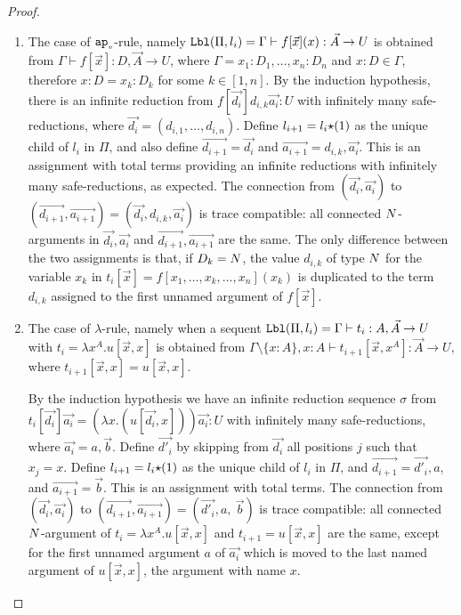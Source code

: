 \begin{proof}
\begin{enumerate}
\item
  The case of ${{\tt ap}_{\mbox{\tiny $v$}}}$-rule, namely 
  ${\tt Lbl}(\Pi,l_i) 
  = 
  \Gamma \vdash f[\vec{x}](x): \vec{A}\rightarrow U$ is obtained from
  $\Gamma \vdash f[\vec{x}]: D,\vec{A} \rightarrow U$,
  where $\Gamma=x_1:D_1,\ldots,x_n:D_n$ and $x:D\in\Gamma$, therefore
  $x:D = x_k:D_k$ for some $k \in [1,n]$. 
  By the induction hypothesis, 
  there is an infinite reduction from $f[\vec{d_i}]d_{i,k}\vec{a_i}: U$
  with infinitely many safe-reductions,
  where $\vec{d_i} = (d_{i,1},\ldots,d_{i,n})$. 
  Define $l_{i+1}=l_i{\star}(1)$ as the unique child of $l_i$ in $\Pi$, and
  also define $\vec{d_{i+1}} = \vec{d_i}$ and $\vec{a_{i+1}} = d_{i,k},\vec{a_i}$. 
  This is an assignment with total terms providing an infinite reductions with 
  infinitely many safe-reductions, as expected.
  The connection from
  $(\vec{d_i},\vec{a_i})$ to
  $(\vec{d_{i+1}},\vec{a_{i+1}}) = (\vec{d_i},d_{i,k},\vec{a_i})$
  is trace compatible: all connected ${N}$-arguments in $\vec{d_i},\vec{a_i}$ and 
  $\vec{d_{i+1}},\vec{a_{i+1}}$ are the same.  
  The only difference between the two assignments
  is that, if $D_k = {N}$, the value $d_{i,k}$ of type ${N}$ for the variable $x_k$
  in $t_i[\vec{x}]=f[x_1,\ldots,x_k,\ldots,x_n](x_k)$ is duplicated to the term $d_{i,k}$ 
  assigned to the first unnamed argument of $ f[\vec{x}]$. 


\item
  The case of $\lambda$-rule, namely when a sequent
  $
    {\tt Lbl}(\Pi,l_i) 
    = 
    \Gamma\vdash t_i : A, \vec{A} \rightarrow U
  $ 
  with 
  $
    t_i 
    = 
    \lambda x^A.u[\vec{x},x]
  $
  is obtained from
  $
  \Gamma\setminus\{x:A\},x:A
  \vdash 
  t_{i+1}[\vec{x},x^A]:\vec{A}\rightarrow U
  $, 
  where $t_{i+1}[\vec{x},x]=u[\vec{x},x]$.
  
  By the induction hypothesis we have an infinite reduction sequence $\sigma$ from
  $t_i[\vec{d_i}]\vec{a_i} = (\lambda x.(u[\vec{d_i},x]))\vec{a_i}: U$ 
  with infinitely many safe-reductions, where $\vec{a_i} = a,\vec{b}$. 
  Define $\vec{d'_i}$ by skipping from $\vec{d_i}$ all positions $j$ such that $x_j = x$.
  Define $l_{i+1}=l_i{\star}(1)$ as the unique child of $l_i$ in $\Pi$,
  and $\vec{d_{i+1}} = \vec{d'_i},a$, and $\vec{a_{i+1}} = \vec{b}$. 
  This is an assignment with total terms. The connection from 
  $(\vec{d_i},\vec{a_i})$ to $(\vec{d_{i+1}},\vec{a_{i+1}}) = (\vec{d'_i},a, \ \vec{b})$ is
  trace compatible: all connected ${N}$-argument of 
  $t_{i}=\lambda x^A.u[\vec{x},x]$ and $t_{i+1}=u[\vec{x},x]$ are 
  the same, except for the first unnamed argument $a$ of $\vec{a_i}$ which is moved to
  the last named argument of $u[\vec{x},x]$, the argument with name $x$.
 

\end{enumerate}
\end{proof}
